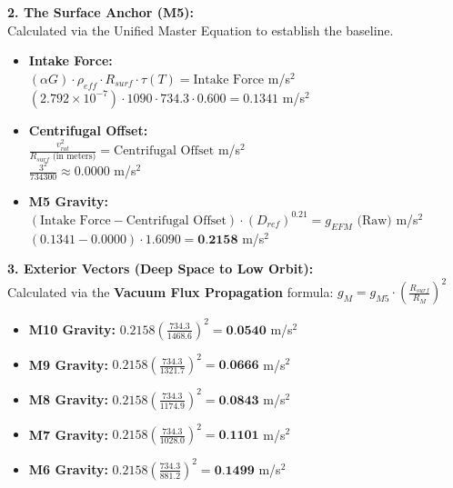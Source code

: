 \documentclass[11pt, a4paper]{article}
\begin{document}
  \vspace{1.0em}
  \noindent \textbf{2. The Surface Anchor (M5):} \\
  \hspace*{1em} Calculated via the Unified Master Equation to establish the baseline.
  \begin{itemize}
    \item \textbf{Intake Force:} \\[0.5em]
    \hspace*{2em} $(\alpha G) \cdot \rho_{eff} \cdot R_{surf} \cdot \tau(T) = \text{Intake Force}$ m/s$^2$ \\[1em]
    \hspace*{2em} $(2.792 \times 10^{-7}) \cdot 1090 \cdot 734.3 \cdot 0.600 = 0.1341$ m/s$^2$
    
    \item \textbf{Centrifugal Offset:} \\[0.5em]
    \hspace*{2em} $\frac{v_{rot}^2}{R_{surf} \text{ (in meters)}} = \text{Centrifugal Offset}$ m/s$^2$ \\[1em]
    \hspace*{2em} $\frac{3^2}{734300} \approx 0.0000$ m/s$^2$
    
    \item \textbf{M5 Gravity:} \\[0.5em]
    \hspace*{2em} $(\text{Intake Force} - \text{Centrifugal Offset}) \cdot (D_{ref})^{0.21} = g_{EFM} \text{ (Raw)}$ m/s$^2$ \\[1em]
    \hspace*{2em} $(0.1341 - 0.0000) \cdot 1.6090 = \textbf{0.2158}$ m/s$^2$
  \end{itemize}

  \clearpage
  \noindent \textbf{3. Exterior Vectors (Deep Space to Low Orbit):} \\
  \hspace*{1em} Calculated via the \textbf{Vacuum Flux Propagation} formula: $g_M = g_{M5} \cdot \left( \frac{R_{surf}}{R_M} \right)^2$
  \begin{itemize}
    \item \textbf{M10 Gravity:} $0.2158 \left( \frac{734.3}{1468.6} \right)^2 = \textbf{0.0540}$ m/s$^2$
    \item \textbf{M9 Gravity:} $0.2158 \left( \frac{734.3}{1321.7} \right)^2 = \textbf{0.0666}$ m/s$^2$
    \item \textbf{M8 Gravity:} $0.2158 \left( \frac{734.3}{1174.9} \right)^2 = \textbf{0.0843}$ m/s$^2$
    \item \textbf{M7 Gravity:} $0.2158 \left( \frac{734.3}{1028.0} \right)^2 = \textbf{0.1101}$ m/s$^2$
    \item \textbf{M6 Gravity:} $0.2158 \left( \frac{734.3}{881.2} \right)^2 = \textbf{0.1499}$ m/s$^2$
  \end{itemize}
\end{document}
